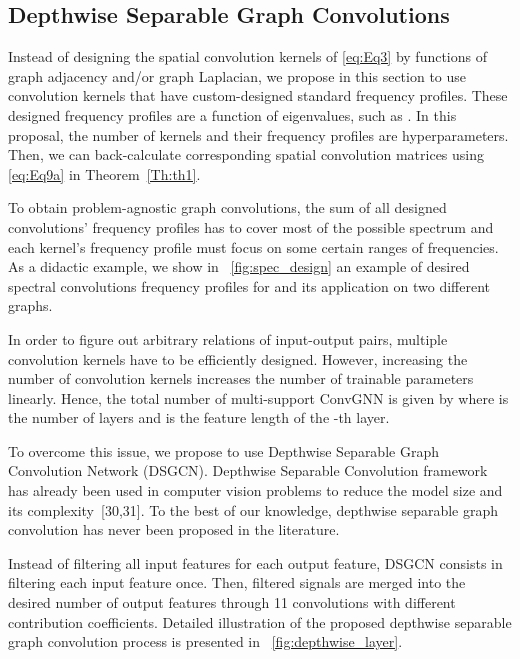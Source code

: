 \documentclass{article}
\begin{document}
\subsection{Depthwise Separable Graph Convolutions}
\label{section:depthwise}

Instead of designing the spatial convolution kernels  of \eqref{eq:Eq3}  by  functions of graph adjacency and/or graph Laplacian, we propose in this section to use  convolution kernels that have custom-designed standard frequency profiles. These designed frequency profiles are a function of eigenvalues, such as . In this proposal, the number of kernels and their frequency profiles are hyperparameters. Then, we can back-calculate corresponding spatial convolution matrices using \eqref{eq:Eq9a} in Theorem~\ref{Th:th1}.

To obtain problem-agnostic graph convolutions, the sum of all designed convolutions’ frequency profiles has to cover most of the possible spectrum and each kernel's frequency profile must focus on some certain ranges of frequencies. As a didactic example, we show in \figurename~\ref{fig:spec_design} an example of desired spectral convolutions frequency profiles for  and its application on two different graphs. 


In order to figure out arbitrary relations of input-output pairs, multiple convolution kernels have to be efficiently designed. However, increasing the number  of convolution kernels  increases the number of trainable parameters linearly. Hence,  the total number of multi-support ConvGNN  is given by  where  is the number of layers and  is the feature length of the -th layer.

To overcome this issue, we propose to use Depthwise Separable Graph Convolution Network (DSGCN). Depthwise Separable Convolution framework has already been used in computer vision problems to reduce
the model size and its complexity~[30,31]. To the best of our knowledge, depthwise separable graph convolution has never been proposed  in the literature.  

 Instead of filtering all input features for each output feature, DSGCN consists in  filtering each input feature once. Then, filtered signals are merged into the desired number of output features through 11 convolutions with  different contribution coefficients. Detailed illustration of the proposed depthwise separable graph convolution process is presented in \figurename~\ref{fig:depthwise_layer}.
\end{document}
